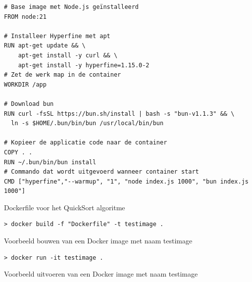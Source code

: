 \begin{listing}[H]
  \centering
  \begin{verbatim}
# Base image met Node.js geïnstalleerd
FROM node:21

# Installeer Hyperfine met apt
RUN apt-get update && \
    apt-get install -y curl && \
    apt-get install -y hyperfine=1.15.0-2
# Zet de werk map in de container
WORKDIR /app

# Download bun
RUN curl -fsSL https://bun.sh/install | bash -s "bun-v1.1.3" && \
  ln -s $HOME/.bun/bin/bun /usr/local/bin/bun

# Kopieer de applicatie code naar de container
COPY . .
RUN ~/.bun/bin/bun install
# Commando dat wordt uitgevoerd wanneer container start
CMD ["hyperfine","--warmup", "1", "node index.js 1000", "bun index.js 1000"]
      \end{verbatim}
      \caption[Dockerfile QuickSort algoritme]{\label{code:dockerscript}Dockerfile voor het QuickSort algoritme}
\end{listing}
\begin{listing}[H]
  \centering
  \begin{verbatim}
> docker build -f "Dockerfile" -t testimage .
      \end{verbatim}
      \caption[Commando voor Docker image te bouwen]{\label{code:dockerbuild}Voorbeeld bouwen van een Docker image met naam testimage}
\end{listing}
\begin{listing}[H]
  \centering
  \begin{verbatim}
> docker run -it testimage .
      \end{verbatim}
      \caption[Commando voor Docker image uit te voeren]{\label{code:dockerrun}Voorbeeld uitvoeren van een Docker image met naam testimage}
\end{listing}

